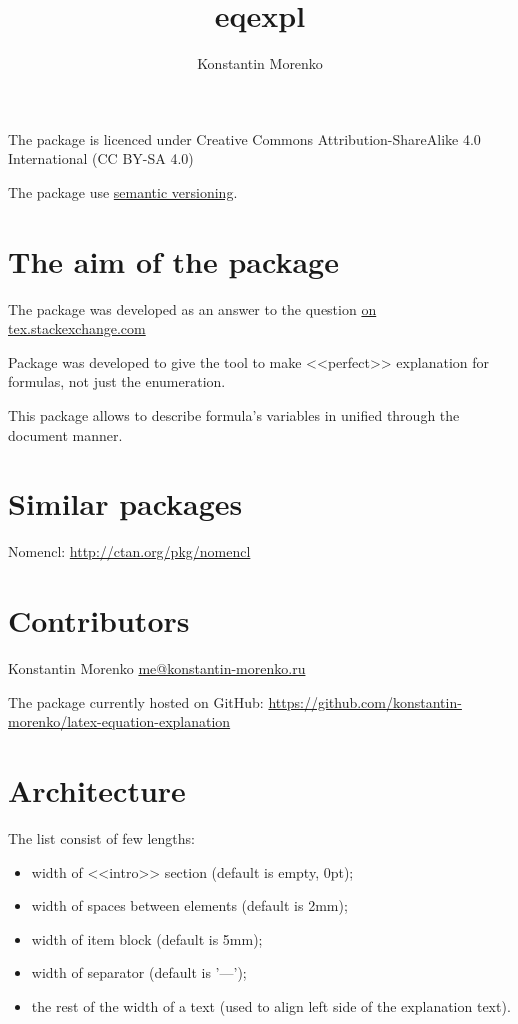\documentclass{article}
\begin{document}
\title{eqexpl}
\author{Konstantin Morenko}

\maketitle

The package is licenced under Creative Commons Attribution-ShareAlike
4.0 International (CC BY-SA 4.0)

The package use \href{https://semver.org/}{semantic versioning}.

\section{The aim of the package}

The package was developed as an answer to the question \href{https://tex.stackexchange.com/q/95838/119485}{on tex.stackexchange.com}

Package was developed to give the tool to make <<perfect>> explanation
for formulas, not just the enumeration.

This package allows to describe formula's variables in unified through
the document manner.

\section{Similar packages}

Nomencl: \href{http://ctan.org/pkg/nomencl}{http://ctan.org/pkg/nomencl}

\section{Contributors}

Konstantin Morenko \href{mailto:me@konstantin-morenko.ru}{me@konstantin-morenko.ru}

The package currently hosted on GitHub:
\href{https://github.com/konstantin-morenko/latex-equation-explanation}{https://github.com/konstantin-morenko/latex-equation-explanation}

\section{Architecture}

The list consist of few lengths:
\begin{itemize}
\item width of <<intro>> section (default is empty, 0pt);
\item width of spaces between elements (default is 2mm);
\item width of item block (default is 5mm);
\item width of separator (default is '---');
\item the rest of the width of a text (used to align left side of the
  explanation text).
\end{itemize}
\end{document}
